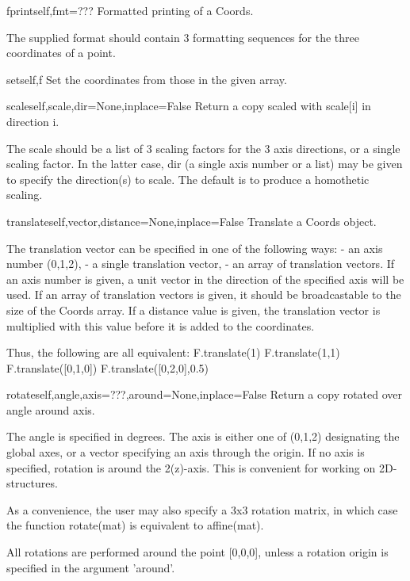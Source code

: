 \begin{funcdesc}{fprint}{self,fmt=???}
Formatted printing of a Coords.

        The supplied format should contain 3 formatting sequences for the
        three coordinates of a point.
        
\end{funcdesc}

\begin{funcdesc}{set}{self,f}
Set the coordinates from those in the given array.
\end{funcdesc}

\begin{funcdesc}{scale}{self,scale,dir=None,inplace=False}
Return a copy scaled with scale[i] in direction i.

        The scale should be a list of 3 scaling factors for the 3 axis
        directions, or a single scaling factor.
        In the latter case, dir (a single axis number or a list) may be given
        to specify the direction(s) to scale. The default is to produce a
        homothetic scaling.
        
\end{funcdesc}

\begin{funcdesc}{translate}{self,vector,distance=None,inplace=False}
Translate a Coords object.

        The translation vector can be specified in one of the following ways:
        - an axis number (0,1,2),
        - a single translation vector,
        - an array of translation vectors.
        If an axis number is given, a unit vector in the direction of the
        specified axis will be used.
        If an array of translation vectors is given, it should be
        broadcastable to the size of the Coords array.
        If a distance value is given, the translation vector is multiplied
        with this value before it is added to the coordinates.

        Thus, the following are all equivalent:
          F.translate(1)
          F.translate(1,1)
          F.translate([0,1,0])
          F.translate([0,2,0],0.5)
        
\end{funcdesc}

\begin{funcdesc}{rotate}{self,angle,axis=???,around=None,inplace=False}
Return a copy rotated over angle around axis.

        The angle is specified in degrees.
        The axis is either one of (0,1,2) designating the global axes,
        or a vector specifying an axis through the origin.
        If no axis is specified, rotation is around the 2(z)-axis. This is
        convenient for working on 2D-structures.

        As a convenience, the user may also specify a 3x3 rotation matrix,
        in which case the function rotate(mat) is equivalent to affine(mat).

        All rotations are performed around the point [0,0,0], unless a
        rotation origin is specified in the argument 'around'. 
        
\end{funcdesc}

